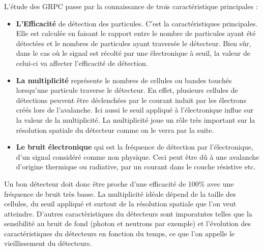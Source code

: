 L'étude des GRPC passe par la connaissance de trois caractéristique principales :
\begin{itemize}[label=$\bullet$]
	\item \textbf{L'Efficacité} de détection des particules. C'est la caractéristiques principales. Elle est calculée en faisant le rapport entre le nombre de particules ayant été détectées et le nombres de particules ayant traversée le détecteur. Bien sûr, dans le cas où le signal est récolté par une électronique à seuil, la valeur de celui-ci va affecter l'efficacité de détection.
	\item \textbf{La multiplicité} représente le nombres de cellules ou bandes touchés lorsqu'une particule traverse le détecteur. En effet, plusieurs cellules de détections peuvent être déclenchées par le courant induit par les électrons créés lors de l'avalanche. Ici aussi le seuil appliqué à l'électronique influe sur la valeur de la multiplicité. La multiplicité joue un rôle très important sur la résolution spatiale du détecteur comme on le verra par la suite.
	\item \textbf{Le bruit électronique} qui est la fréquence de détection par l'électronique, d'un signal considéré comme non physique. Ceci peut être dû à une avalanche d'origine thermique ou radiative, par un courant dans le couche résistive etc. 
\end{itemize}

Un bon détecteur doit donc être proche d'une efficacité de 100\% avec une fréquence de bruit très basse. La multiplicité idéale dépend de la taille des cellules, du seuil appliqué et surtout de la résolution spatiale que l'on veut atteindre. D'autres caractèristiques du détecteurs sont imporatntes telles que la sensibilité au bruit de fond (photon et neutrons par exemple) et l'évolution des caractéristiques du détecteurs en fonction du temps, ce que l'on appelle le vieillissement du détecteurs.

